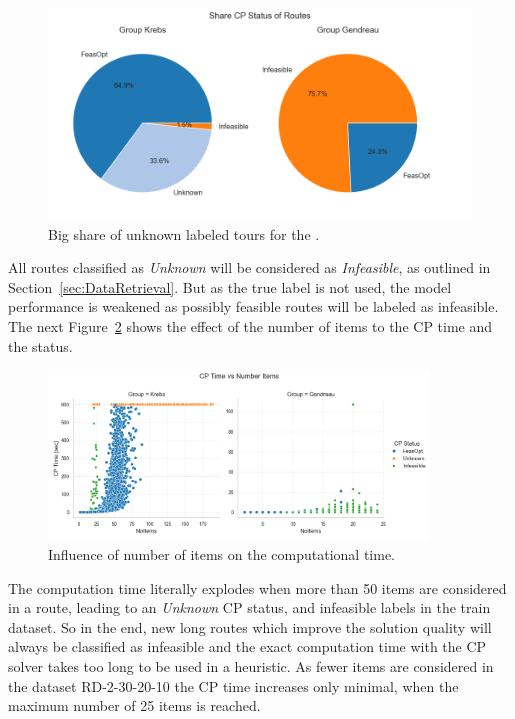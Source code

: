 \begin{figure}[ht]
	\centering
	\includegraphics[width=\textwidth]{pictures/comparison_krebs_gendreau/pie_chart_share_cp_status.png}
	\caption{Big share of unknown labeled tours for the \krebsADataSet.}
	\label{fig:comparison_krebs_gendreau_piechart}
\end{figure}
All routes classified as \textit{Unknown} will be considered as \textit{Infeasible}, as outlined in Section~\ref{sec:DataRetrieval}. But
as the true label is not used, the model performance is weakened as possibly feasible routes will be labeled as infeasible. The
next Figure~\ref{fig:comparison_krebs_gendreau_numberItems} shows the effect of the number of items to the \gls{CP} time and the status.

\begin{figure}[ht]
	\centering
	\includegraphics[width=0.9\textwidth]{pictures/comparison_krebs_gendreau/number_items_cp_status.png}
	\caption{Influence of number of items on the computational time.}
	\label{fig:comparison_krebs_gendreau_numberItems}
\end{figure}

The computation time literally explodes when more than 50 items are considered in a route, leading to an \textit{Unknown} \gls{CP} status, and
infeasible labels in the train dataset. So in the end, new long routes which improve the solution quality will always be classified as infeasible
and the exact computation time with the \gls{CP} solver takes too long to be used in a heuristic. As fewer items are considered in the dataset
RD-2-30-20-10 the \gls{CP} time increases only minimal, when the maximum number of 25 items is reached.

